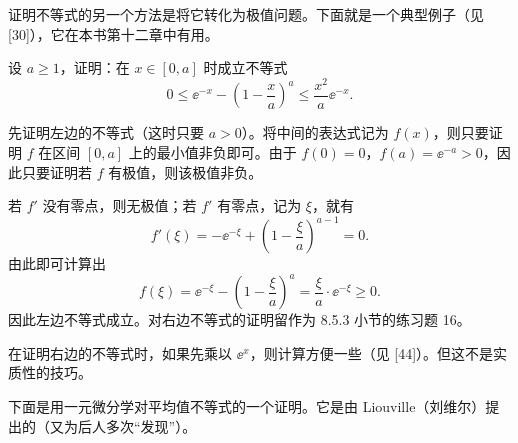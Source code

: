 证明不等式的另一个方法是将它转化为极值问题。下面就是一个典型例子（见 [30]），它在本书第十二章中有用。

\begin{xexample}[8.5.4]
设 $a\ge1$，证明：在 $x\in[0,a]$ 时成立不等式
\[
  0\le\ee^{-x}-\left(1-\frac xa\right)^a
  \le\frac{x^2}{a}\ee^{-x}.
\]
\end{xexample}
\begin{xproof}
先证明左边的不等式（这时只要 $a>0$）。将中间的表达式记为 $f(x)$，则只要证明 $f$ 在区间 $[0,a]$ 上的最小值非负即可。由于 $f(0)=0$，$f(a)=\ee^{-a}>0$，因此只要证明若 $f$ 有极值，则该极值非负。

若 $f'$ 没有零点，则无极值；若 $f'$ 有零点，记为 $\xi$，就有
\[
  f'(\xi)=-\ee^{-\xi}+\left(1-\frac\xi a\right)^{a-1}=0.
\]
由此即可计算出
\[
  f(\xi)=\ee^{-\xi}-\left(1-\frac\xi a\right)^a
  =\frac\xi a\cdot\ee^{-\xi}\ge0.
\]
因此左边不等式成立。对右边不等式的证明留作为 8.5.3 小节的练习题 16。
\end{xproof}

\begin{xremark}
在证明右边的不等式时，如果先乘以 $\ee^x$，则计算方便一些（见 [44]）。但这不是实质性的技巧。
\end{xremark}

下面是用一元微分学对平均值不等式的一个证明。它是由 Liouville（刘维尔）提出的（又为后人多次“发现”）。

